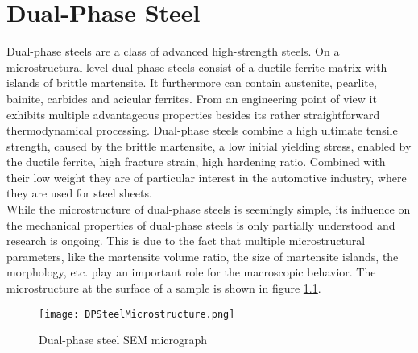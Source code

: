 \chapter{Dual-Phase Steel}

Dual-phase steels are a class of advanced high-strength steels. On a microstructural level dual-phase steels consist of a ductile ferrite matrix with islands of brittle martensite. It furthermore can contain austenite, pearlite, bainite, carbides and acicular ferrites. From an engineering point of view it exhibits multiple advantageous properties besides its rather straightforward thermodynamical processing. Dual-phase steels combine a high ultimate tensile strength, caused by the brittle martensite, a low initial yielding stress, enabled by the ductile ferrite, high fracture strain, high hardening ratio. Combined with their low weight they are of particular interest in the automotive industry, where they are used for steel sheets. \\

While the microstructure of dual-phase steels is seemingly simple, its influence on the mechanical properties of dual-phase steels is only partially understood and research is ongoing. This is due to the fact that multiple microstructural parameters, like the martensite volume ratio, the size of martensite islands, the morphology, etc. play an important role for the macroscopic behavior. The microstructure at the surface of a sample is shown in figure \ref{fig:DPMicrostructure}. \\

\begin{figure}
\centering
  \texttt{[image: DPSteelMicrostructure.png]}
  \caption{Dual-phase steel SEM micrograph}
  \label{fig:DPMicrostructure}
\end{figure}

